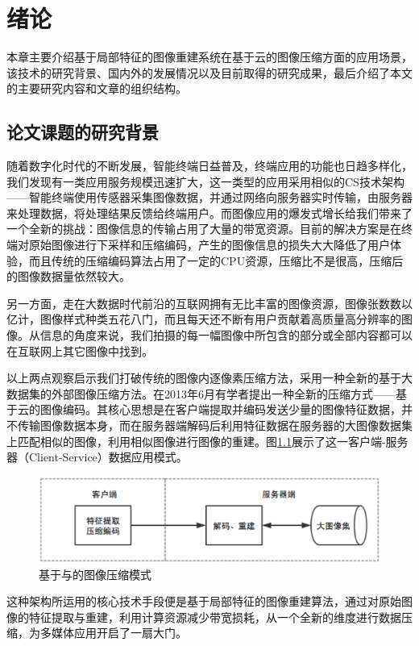 
\chapter{绪论}
本章主要介绍基于局部特征的图像重建系统在基于云的图像压缩方面的应用场景，该技术的研究背景、国内外的发展情况以及目前取得的研究成果，最后介绍了本文的主要研究内容和文章的组织结构。


\section{论文课题的研究背景}

随着数字化时代的不断发展，智能终端日益普及，终端应用的功能也日趋多样化，我们发现有一类应用服务规模迅速扩大，这一类型的应用采用相似的CS技术架构——智能终端使用传感器采集图像数据，并通过网络向服务器实时传输，由服务器来处理数据，将处理结果反馈给终端用户。而图像应用的爆发式增长给我们带来了一个全新的挑战：图像信息的传输占用了大量的带宽资源。目前的解决方案是在终端对原始图像进行下采样和压缩编码，产生的图像信息的损失大大降低了用户体验，而且传统的压缩编码算法占用了一定的CPU资源，压缩比不是很高，压缩后的图像数据量依然较大。

另一方面，走在大数据时代前沿的互联网拥有无比丰富的图像资源，图像张数数以亿计，图像样式种类五花八门，而且每天还不断有用户贡献着高质量高分辨率的图像。从信息的角度来说，我们拍摄的每一幅图像中所包含的部分或全部内容都可以在互联网上其它图像中找到。

以上两点观察启示我们打破传统的图像内逐像素压缩方法，采用一种全新的基于大数据集的外部图像压缩方法。在2013年6月有学者\cite{Yue:2013gl}提出一种全新的压缩方式——基于云的图像编码。其核心思想是在客户端提取并编码发送少量的图像特征数据，并不传输图像数据本身，而在服务器端解码后利用特征数据在服务器的大图像数据集上匹配相似的图像，利用相似图像进行图像的重建。图\ref{fig:overview}展示了这一客户端-服务器（Client-Service）数据应用模式。
\begin{figure}
\centering\includegraphics[width=14cm]{imgs/ch1/overview}
\caption{基于与的图像压缩模式}
\label{fig:overview}
\end{figure}
这种架构所运用的核心技术手段便是基于局部特征的图像重建算法，通过对原始图像的特征提取与重建，利用计算资源减少带宽损耗，从一个全新的维度进行数据压缩，为多媒体应用开启了一扇大门。

